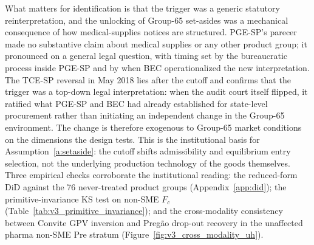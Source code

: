 What matters for identification is that the trigger was a generic statutory reinterpretation, and the unlocking of Group-65 set-asides was a mechanical consequence of how medical-supplies notices are structured. PGE-SP's parecer made no substantive claim about medical supplies or any other product group; it pronounced on a general legal question, with timing set by the bureaucratic process inside PGE-SP and by when BEC operationalized the new interpretation. The TCE-SP reversal in May 2018 lies after the cutoff and confirms that the trigger was a top-down legal interpretation: when the audit court itself flipped, it ratified what PGE-SP and BEC had already established for state-level procurement rather than initiating an independent change in the Group-65 environment. The change is therefore exogenous to Group-65 market conditions on the dimensions the design tests. This is the institutional basis for Assumption~\ref{a:setaside}: the cutoff shifts admissibility and equilibrium entry selection, not the underlying production technology of the goods themselves. Three empirical checks corroborate the institutional reading: the reduced-form DiD against the 76 never-treated product groups (Appendix~\ref{app:did}); the primitive-invariance KS test on non-SME $F_c$ (Table~\ref{tab:v3_primitive_invariance}); and the cross-modality consistency between Convite GPV inversion and Preg\~ao drop-out recovery in the unaffected pharma non-SME Pre stratum (Figure~\ref{fig:v3_cross_modality_uh}).

